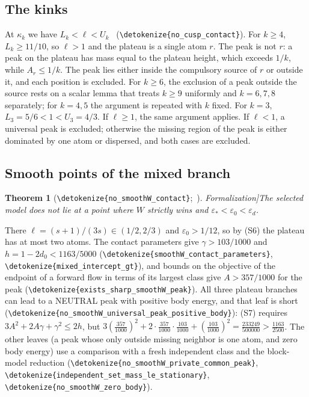 \documentclass[10pt]{article}
\newtheorem{theorem}{Theorem}[section]
\theoremstyle{definition}
\theoremstyle{remark}
\numberwithin{equation}{section}
\newcommand{\eps}{\varepsilon}
\newcommand{\leanid}[1]{\expandafter\nolinkurl\expandafter{\detokenize{#1}}}
\newcommand{\Fm}[1]{\cite[#1]{Formalization}}
\begin{document}
\subsection{The kinks}\label{sec:cusps}
At $\kappa_k$ we have $L_k<\ell<U_k$~\Fm{\S10.5} (\leanid{no_cusp_contact}). For $k\ge4$, $L_k\ge11/10$, so $\ell>1$ and the plateau is a single atom $r$. The peak is not $r$: a peak on the plateau has mass equal to the plateau height, which exceeds $1/k$, while $A_r\le1/k$. The peak lies either inside the compulsory source of $r$ or outside it, and each position is excluded. For $k\ge6$, the exclusion of a peak outside the source rests on a scalar lemma that treats $k\ge9$ uniformly and $k=6,7,8$ separately; for $k=4,5$ the argument is repeated with $k$ fixed. For $k=3$, $L_3=5/6<1<U_3=4/3$. If $\ell\ge1$, the same argument applies. If $\ell<1$, a universal peak is excluded; otherwise the missing region of the peak is either dominated by one atom or dispersed, and both cases are excluded.

\subsection{Smooth points of the mixed branch}\label{sec:smoothW}
\begin{theorem}[{\leanid{no_smoothW_contact}};~\Fm{\S10.1}]\label{thm:smoothW}
The selected model does not lie at a point where $W$ strictly wins and $\eps_*<\eps_0<\eps_d$.
\end{theorem}
There $\ell=(s+1)/(3s)\in(1/2,2/3)$ and $\eps_0>1/12$, so by (S6) the plateau has at most two atoms. The contact parameters give $\gamma>103/1000$ and $h=1-2d_0<1163/5000$ (\leanid{smoothW_contact_parameters}, \leanid{mixed_intercept_gt}), and bounds on the objective of the endpoint of a forward flow in terms of its largest class give $A>357/1000$ for the peak (\leanid{exists_sharp_smoothW_peak}). All three plateau branches can lead to a NEUTRAL peak with positive body energy, and that leaf is short (\leanid{no_smoothW_universal_peak_positive_body}): (S7) requires $3A^2+2A\gamma+\gamma^2\le2h$, but $3(\frac{357}{1000})^2+2\cdot\frac{357}{1000}\cdot\frac{103}{1000}+(\frac{103}{1000})^2=\frac{233249}{500000}>\frac{1163}{2500}$. The other leaves (a peak whose only outside missing neighbor is one atom, and zero body energy) use a comparison with a fresh independent class and the block-model reduction (\leanid{no_smoothW_private_common_peak}, \leanid{independent_set_mass_le_stationary}, \leanid{no_smoothW_zero_body}).
\end{document}
